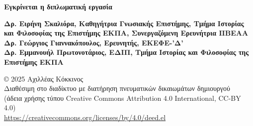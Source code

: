 \documentclass{article}
\begin{document}
\newpage
\begin{greek}
	\thispagestyle{empty}
	\vspace*{2cm}
	
	\begin{center}
		\textbf{Εγκρίνεται η διπλωματική εργασία}
	\end{center}
	
	\vspace{4cm}
	
	\begin{flushleft}
		\textbf{Δρ. Ειρήνη Σκαλιόρα, Καθηγήτρια Γνωσιακής Επιστήμης, Τμήμα Ιστορίας και Φιλοσοφίας της Επιστήμης ΕΚΠΑ, Συνεργαζόμενη Ερευνήτρια ΙΙΒΕΑΑ} \\[3cm]
		
		\textbf{Δρ. Γεώργιος Γιαννακόπουλος, Ερευνητής, ΕΚΕΦΕ-’Δ’} \\[3cm]
		
		\textbf{Δρ. Εμμανουήλ Πρωτονοτάριος, ΕΔΙΠ, Τμήμα Ιστορίας και Φιλοσοφίας της Επιστήμης ΕΚΠΑ}
	\end{flushleft}

	\vfill
	
	\begin{flushleft}
		{\small
			© 2025 Αχιλλέας Κόκκινος \\
			Διαθέσιμη στο διαδίκτυο με διατήρηση πνευματικών δικαιωμάτων δημιουργού \\
			(άδεια χρήσης τύπου Creative Commons Attribution 4.0 International, CC-BY 4.0) \\
			\url{https://creativecommons.org/licenses/by/4.0/deed.el}
		}
	\end{flushleft}
	
\end{greek}
\newpage
\end{document}
